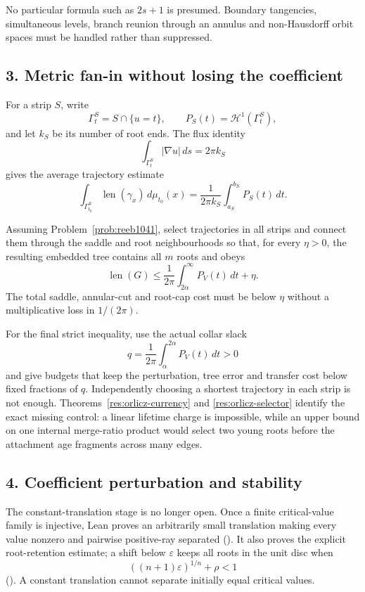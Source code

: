 No particular formula such as $2s+1$ is presumed.  Boundary tangencies,
simultaneous levels, branch reunion through an annulus and non-Hausdorff orbit
spaces must be handled rather than suppressed.

\subsection*{3. Metric fan-in without losing the coefficient}

For a strip $S$, write
\[
 \Gamma_t^S=S\cap\{u=t\},\qquad
 P_S(t)=\mathcal H^1(\Gamma_t^S),
\]
and let $k_S$ be its number of root ends.  The flux identity
\[
 \int_{\Gamma_t^S}|\nabla u|\,ds=2\pi k_S
\]
gives the average trajectory estimate
\[
 \int_{\Gamma_{t_0}^S}\operatorname{len}(\gamma_x)\,d\mu_{t_0}(x)
 =
 \frac1{2\pi k_S}\int_{a_S}^{b_S}P_S(t)\,dt.
\]

\begin{problem}\label{prob:metric1041}
Assuming Problem~\ref{prob:reeb1041}, select trajectories in all strips and
connect them through the saddle and root neighbourhoods so that, for every
$\eta>0$, the resulting embedded tree contains all $m$ roots and obeys
\[
 \operatorname{len}(G)
 \le\frac1{2\pi}\int_{2\alpha}^{\infty}P_V(t)\,dt+\eta.
\tag{6.1}\label{eq:metric-fanin1041}
\]
The total saddle, annular-cut and root-cap cost must be below $\eta$ without a
multiplicative loss in $1/(2\pi)$.
\end{problem}

For the final strict inequality, use the actual collar slack
\[
 q=\frac1{2\pi}\int_{\alpha}^{2\alpha}P_V(t)\,dt>0
\]
and give budgets that keep the perturbation, tree error and transfer cost below
fixed fractions of $q$.  Independently choosing a shortest trajectory in each
strip is not enough.  Theorems~\ref{res:orlicz-currency} and
\ref{res:orlicz-selector} identify the exact missing control: a linear
lifetime charge is impossible, while an upper bound on one internal
merge-ratio product would select two young roots before the attachment age
fragments across many edges.

\subsection*{4. Coefficient perturbation and stability}

The constant-translation stage is no longer open.  Once a finite critical-value
family is injective, Lean proves an arbitrarily small translation making every
value nonzero and pairwise positive-ray separated
().  It also proves the
explicit root-retention estimate; a shift below $\varepsilon$ keeps all roots
in the unit disc when
\[
 ((n+1)\varepsilon)^{1/n}+\rho<1
\]
().  A constant translation
cannot separate initially equal critical values.

